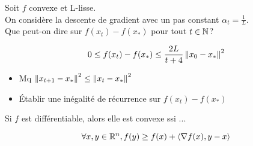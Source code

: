 \begin{note}
  \begin{field}
    Soit $f$ convexe et L-lisse.\\
    On considère la descente de gradient avec un pas constant $\alpha_t
    = \frac{1}{L}$.\\
    Que peut-on dire sur $f(x_t) - f(x_*)$ pour tout $t \in \mathbb{N}$?
  \end{field}
  \begin{field}
    $$0\leq f(x_t) - f(x_*) \leq \frac{2L}{t+4}\left\lVert x_0-x_*\right\rVert^2$$
  \end{field}
  \begin{field}
    \begin{itemize}
    \item Mq $\left\lVert x_{t+1}-x_*\right\rVert^2 \leq \left\lVert x_t-x_*\right\rVert^2$
    \item Établir une inégalité de récurrence sur $f(x_t) - f(x_*)$
    \end{itemize}
  \end{field}
\end{note}

\begin{note}
  \begin{field}
    Si $f$ est différentiable, alors elle est convexe ssi ...
  \end{field}
  \begin{field}
    $$\forall x,y \in \mathbb{R}^n, f(y) \geq f(x) + \langle\nabla
      f(x),y-x\rangle$$
  \end{field}
  \begin{field}
  \end{field}
\end{note}

